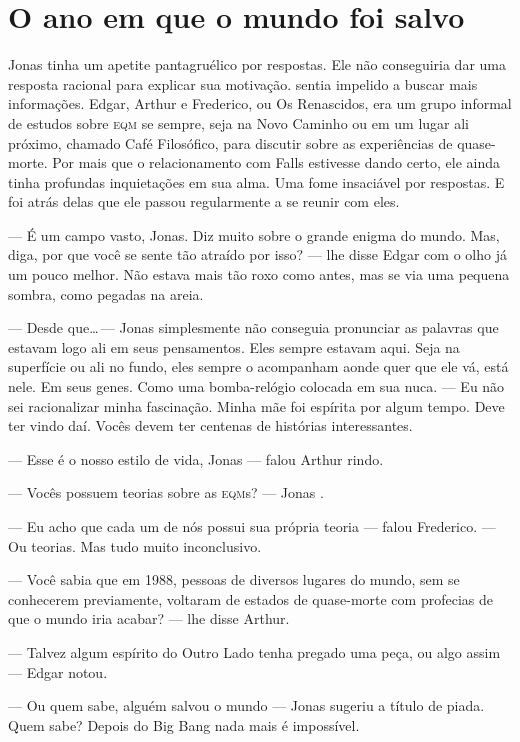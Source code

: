 \chapter{O ano em que o mundo foi salvo}

Jonas tinha um apetite pantagruélico por respostas. Ele não conseguiria dar uma resposta racional para explicar sua motivação.  sentia impelido a buscar mais informações. Edgar, Arthur e Frederico, ou Os Renascidos, era um grupo informal de estudos sobre \textsc{eqm}  se  sempre, seja na Novo Caminho ou em um lugar ali próximo, chamado Café Filosófico, para discutir sobre as experiências de quase-morte. Por mais que o relacionamento com Falls estivesse dando certo, ele ainda tinha profundas inquietações em sua alma. Uma fome insaciável por respostas. E foi atrás delas que ele passou regularmente a se reunir com eles.

--- É um campo vasto, Jonas. Diz muito sobre o grande enigma do mundo. Mas, diga, por que você se sente tão atraído por isso? --- lhe disse Edgar\mudanca{,} com o olho já um pouco melhor. Não estava mais tão roxo como antes, mas se via uma pequena sombra, como pegadas na areia.

--- Desde que\ldots\,--- Jonas simplesmente não conseguia pronunciar as palavras que estavam logo ali em seus pensamentos. Eles sempre estavam aqui. Seja na superfície ou ali no fundo, eles sempre o acompanham aonde quer que ele vá, está nele. Em seus genes. Como uma bomba-relógio colocada em sua nuca. --- Eu não sei racionalizar minha fascinação. Minha mãe foi espírita por algum tempo. Deve ter vindo daí. Vocês devem ter centenas de histórias interessantes.

--- Esse é o nosso estilo de vida, Jonas --- falou Arthur rindo.

--- Vocês possuem teorias sobre as \textsc{eqm}s? --- Jonas .

--- Eu acho que cada um de nós possui sua própria teoria --- falou Frederico. --- Ou teorias. Mas tudo muito inconclusivo.

--- Você sabia que\mudanca{,} em 1988, pessoas de diversos lugares do mundo, sem se conhecerem previamente, voltaram de estados de quase-morte com profecias de que o mundo iria acabar? --- lhe disse Arthur.

--- Talvez algum espírito do Outro Lado tenha pregado uma peça, ou algo assim --- Edgar notou.

--- Ou quem sabe, alguém salvou o mundo --- Jonas sugeriu\mudanca{,} a título de piada. Quem sabe? Depois do Big Bang\mudanca{,} nada mais é impossível.

